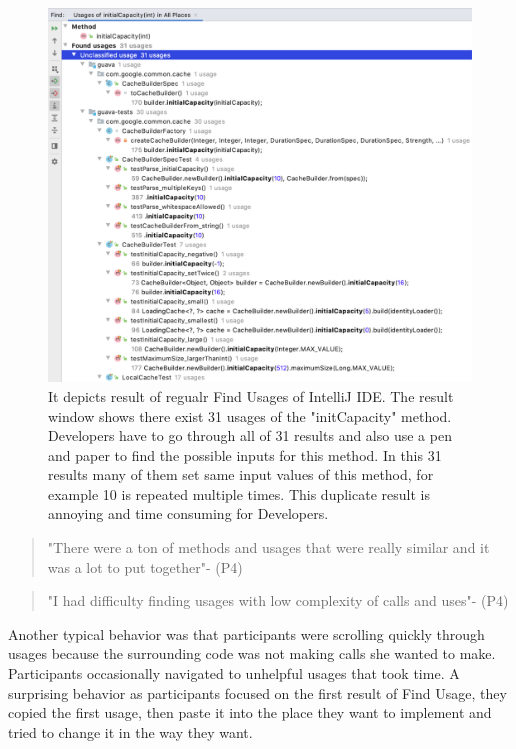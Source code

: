 \documentclass[conference]{IEEEtran}
\begin{document}
\begin{figure}
    \centering
    \includegraphics [width=\columnwidth,keepaspectratio, clip]{figures/challenge}
    \caption{It depicts result of regualr Find Usages of IntelliJ IDE. The result window shows there exist 31 usages of the "initCapacity" method. Developers have to go through all of 31 results and also use a pen and paper to find the possible inputs for this method. In this 31 results many of them set same input values of this method, for example 10 is repeated multiple times. This duplicate result is annoying and time consuming for Developers. 
}
\label{fig:usege}
\end{figure}

\begin{quote}"There were a ton of methods and usages that were really similar and it was a lot to put together"- (P4)\end{quote}
\begin{quote}"I had difficulty finding usages with low complexity of calls and uses"- (P4)\end{quote}

Another typical behavior was that participants were scrolling quickly through usages because the surrounding code was not making calls she wanted to make. Participants occasionally navigated to unhelpful usages that took time. A surprising behavior as participants focused on the first result of Find Usage, they copied the first usage, then paste it into the place they want to implement and tried to change it in the way they want.\par 
\end{document}
